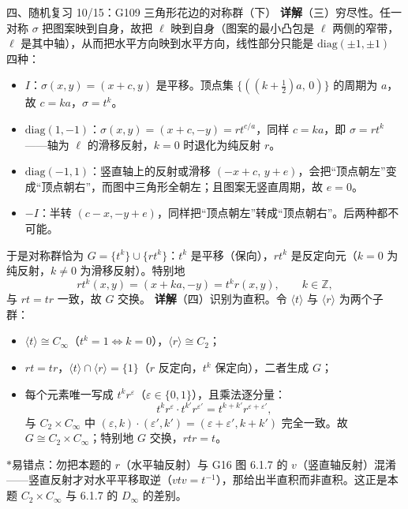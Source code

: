 \documentclass[aspectratio=169,10pt,fontset=none]{ctexbeamer}
\newcommand{\key}[1]{\textcolor{ink}{\bfseries #1}}
\newcommand{\starpt}{\textcolor{accent}{\bfseries$\ast$}}
\begin{document}
\begin{frame}[t]{四、随机复习 10/15：G109 三角形花边的对称群（下）}
\scriptsize
\key{详解}（三）穷尽性。任一对称 $\sigma$ 把图案映到自身，故把 $\ell$ 映到自身（图案的最小凸包是 $\ell$ 两侧的窄带，$\ell$ 是其中轴），从而把水平方向映到水平方向，线性部分只能是 $\mathrm{diag}(\pm1,\pm1)$ 四种：
\begin{itemize}\setlength{\itemsep}{1pt}\setlength{\parsep}{0pt}
\item $I$：$\sigma(x,y)=(x+c,y)$ 是平移。顶点集 $\{((k+\frac12)a,\,0)\}$ 的周期为 $a$，故 $c=ka$，$\sigma=t^k$。
\item $\mathrm{diag}(1,-1)$：$\sigma(x,y)=(x+c,-y)=rt^{c/a}$，同样 $c=ka$，即 $\sigma=rt^k$——轴为 $\ell$ 的滑移反射，$k=0$ 时退化为纯反射 $r$。
\item $\mathrm{diag}(-1,1)$：竖直轴上的反射或滑移 $(-x+c,\,y+e)$，会把“顶点朝左”变成“顶点朝右”，而图中三角形全朝左；且图案无竖直周期，故 $e=0$。
\item $-I$：半转 $(c-x,-y+e)$，同样把“顶点朝左”转成“顶点朝右”。后两种都不可能。
\end{itemize}
于是对称群恰为 $G=\{t^k\}\cup\{rt^k\}$：$t^k$ 是平移（保向），$rt^k$ 是反定向元（$k=0$ 为纯反射，$k\ne0$ 为滑移反射）。特别地
\[ rt^k(x,y)=(x+ka,-y)=t^kr(x,y),\qquad k\in\mathbb Z, \]
与 $rt=tr$ 一致，故 $G$ 交换。
\key{详解}（四）识别为直积。令 $\langle t\rangle$ 与 $\langle r\rangle$ 为两个子群：
\begin{itemize}\setlength{\itemsep}{1pt}\setlength{\parsep}{0pt}
\item $\langle t\rangle\cong C_\infty$（$t^k=1\iff k=0$），$\langle r\rangle\cong C_2$；
\item $rt=tr$，$\langle t\rangle\cap\langle r\rangle=\{1\}$（$r$ 反定向，$t^k$ 保定向），二者生成 $G$；
\item 每个元素唯一写成 $t^kr^\varepsilon$（$\varepsilon\in\{0,1\}$），且乘法逐分量：
\[ t^kr^\varepsilon\cdot t^{k'}r^{\varepsilon'}=t^{k+k'}r^{\varepsilon+\varepsilon'}, \]
与 $C_2\times C_\infty$ 中 $(\varepsilon,k)\cdot(\varepsilon',k')=(\varepsilon+\varepsilon',k+k')$ 完全一致。故 $G\cong C_2\times C_\infty$；特别地 $G$ 交换，$rtr=t$。
\end{itemize}
\starpt 易错点：勿把本题的 $r$（水平轴反射）与 G16 图 6.1.7 的 $v$（竖直轴反射）混淆——竖直反射才对水平平移取逆（$vtv=t^{-1}$），那给出半直积而非直积。这正是本题 $C_2\times C_\infty$ 与 6.1.7 的 $D_\infty$ 的差别。
\end{frame}
\end{document}
